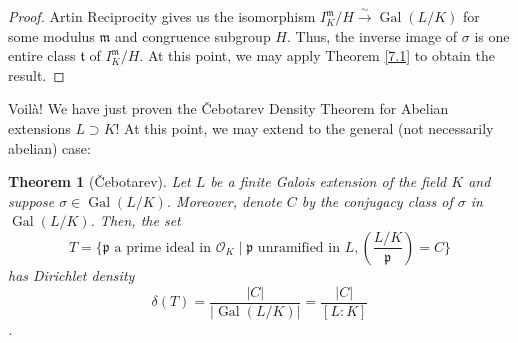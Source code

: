 \documentclass{article}
\DeclareMathOperator{\Gal}{Gal}
\theoremstyle{plain}
\newtheorem{thm}{Theorem}
\theoremstyle{definition}
\theoremstyle{remark}
\numberwithin{equation}{section}
\numberwithin{thm}{section}
\begin{document}
\begin{proof}
Artin Reciprocity gives us the isomorphism $I_{K}^{\mathfrak{m}}/H \xrightarrow{\sim} \Gal(L/K)$ for some modulus $\mathfrak{m}$ and congruence subgroup $H$. Thus, the inverse image of $\sigma$ is one entire class $\mathfrak{t}$ of $I_{K}^{\mathfrak{m}}/H$. At this point, we may apply Theorem \ref{7.1} to obtain the result. 
\end{proof}

Voilà! We have just proven the Čebotarev Density Theorem for Abelian extensions $L \supset K$! At this point, we may extend to the general (not necessarily abelian) case:

\begin{thm}[Čebotarev]
Let $L$ be a finite Galois extension of the field $K$ and suppose $\sigma \in \Gal(L/K)$. Moreover, denote $C$ by the conjugacy class of $\sigma$ in $\Gal(L/K)$. Then, the set $$T = \{\mathfrak{p} \text{ a prime ideal in } \mathcal{O}_K \mid \mathfrak{p} \text{ unramified in } L, \left(\frac{L/K}{\mathfrak{p}}\right) = C\}$$ has Dirichlet density $$ \delta(T) = \frac{|C|}{|\Gal(L/K)|} = \frac{|C|}{[L : K]}$$. 
\end{thm}
\end{document}
